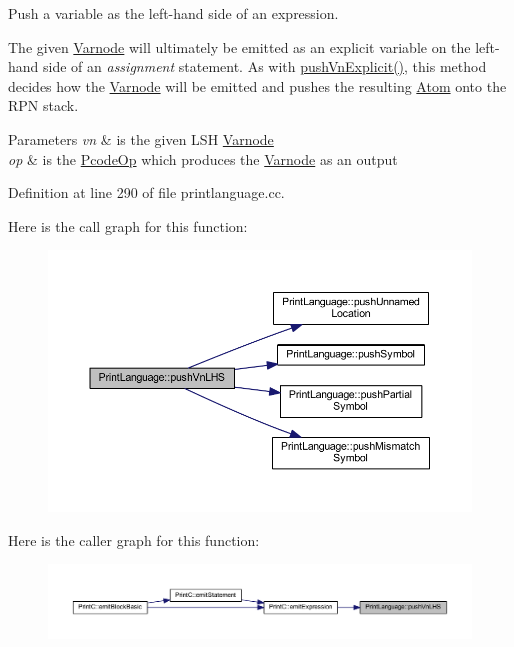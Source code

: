 Push a variable as the left-\/hand side of an expression. 

The given \mbox{\hyperlink{class_varnode}{Varnode}} will ultimately be emitted as an explicit variable on the left-\/hand side of an {\itshape assignment} statement. As with \mbox{\hyperlink{class_print_language_a6ec07b77be217d86b77ec5fec2919b08}{push\+Vn\+Explicit()}}, this method decides how the \mbox{\hyperlink{class_varnode}{Varnode}} will be emitted and pushes the resulting \mbox{\hyperlink{struct_print_language_1_1_atom}{Atom}} onto the R\+PN stack. 
\begin{DoxyParams}{Parameters}
{\em vn} & is the given L\+SH \mbox{\hyperlink{class_varnode}{Varnode}} \\
\hline
{\em op} & is the \mbox{\hyperlink{class_pcode_op}{Pcode\+Op}} which produces the \mbox{\hyperlink{class_varnode}{Varnode}} as an output \\
\hline
\end{DoxyParams}


Definition at line 290 of file printlanguage.\+cc.

Here is the call graph for this function\+:
\nopagebreak
\begin{figure}[H]
\begin{center}
\leavevmode
\includegraphics[width=350pt]{class_print_language_a955ef5ecf066b283738b23abe925f67c_cgraph}
\end{center}
\end{figure}
Here is the caller graph for this function\+:
\nopagebreak
\begin{figure}[H]
\begin{center}
\leavevmode
\includegraphics[width=350pt]{class_print_language_a955ef5ecf066b283738b23abe925f67c_icgraph}
\end{center}
\end{figure}
\mbox{\label{class_print_language_a787cce79247f1e1df842aeb7de8fb7f2}} 
